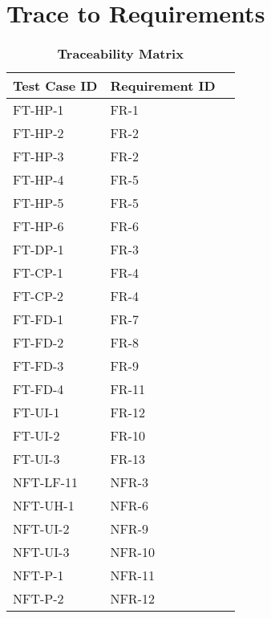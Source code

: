 \documentclass[12pt, titlepage]{article}
\begin{document}
\section{Trace to Requirements}
\begin{table}[!ht]
    \centering
     
    \begin{tabular}{|l|l|l|}
    \hline
        Test Case ID & Requirement ID \\ \hline
        FT-HP-1 & FR-1 \\ \hline
        FT-HP-2 & FR-2 \\ \hline
        FT-HP-3 & FR-2 \\ \hline
        FT-HP-4 & FR-5 \\ \hline
        FT-HP-5 & FR-5 \\ \hline
        FT-HP-6 & FR-6 \\ \hline
        FT-DP-1 & FR-3 \\ \hline
        FT-CP-1 & FR-4 \\ \hline
        FT-CP-2 & FR-4 \\ \hline
        FT-FD-1 & FR-7 \\ \hline
        FT-FD-2 & FR-8 \\ \hline
        FT-FD-3 & FR-9 \\ \hline
        FT-FD-4 & FR-11 \\ \hline
        FT-UI-1 & FR-12 \\ \hline
        FT-UI-2 & FR-10 \\ \hline
        FT-UI-3 & FR-13 \\ \hline
        NFT-LF-11 & NFR-3 \\ \hline
        NFT-UH-1 & NFR-6 \\ \hline
        NFT-UI-2 & NFR-9 \\ \hline
        NFT-UI-3 & NFR-10 \\ \hline
        NFT-P-1 & NFR-11 \\ \hline
        NFT-P-2 & NFR-12 \\ \hline
    \end{tabular}
    \label{Table}
    \caption{\textbf{Traceability Matrix}}
\end{table}

\newpage
\end{document}

